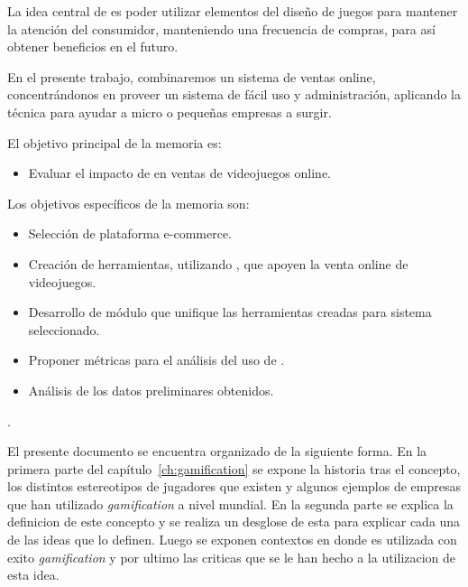 La idea central de  {\GAM} es poder utilizar elementos del diseño de juegos
para mantener la atención del consumidor, manteniendo una frecuencia de compras,
para así obtener beneficios en el futuro.

En el presente trabajo, combinaremos un sistema de ventas online, concentrándonos
en proveer un sistema de fácil uso y administración, aplicando la técnica {\GAM}
para ayudar a micro o pequeñas empresas a surgir.

El objetivo principal de la memoria es:

\begin{itemize}
    \item Evaluar el impacto de {\GAM} en ventas de videojuegos online.
\end{itemize}

Los objetivos específicos de la memoria son:
\begin{itemize}
    \item Selección de plataforma e-commerce.
    \item Creación de herramientas, utilizando {\GAM}, que apoyen la
          venta online de videojuegos.
    \item Desarrollo de módulo que unifique las herramientas creadas para sistema
          seleccionado.
    \item Proponer métricas para el análisis del uso de {\GAM}.
    \item Análisis de los datos preliminares obtenidos.
\end{itemize}

.

El presente documento se encuentra organizado de la siguiente forma.
En la primera parte del capítulo~\ref{ch:gamification} se expone la historia tras
el concepto, los distintos estereotipos de jugadores que existen y algunos ejemplos
de empresas que han utilizado \emph{gamification} a nivel mundial.
En la segunda parte se explica la definicion de este concepto y se realiza un
desglose de esta para explicar cada una de las ideas que lo definen.
Luego se exponen contextos en donde es utilizada con exito \emph{gamification}
y por ultimo las criticas que se le han hecho a la utilizacion de esta idea.

